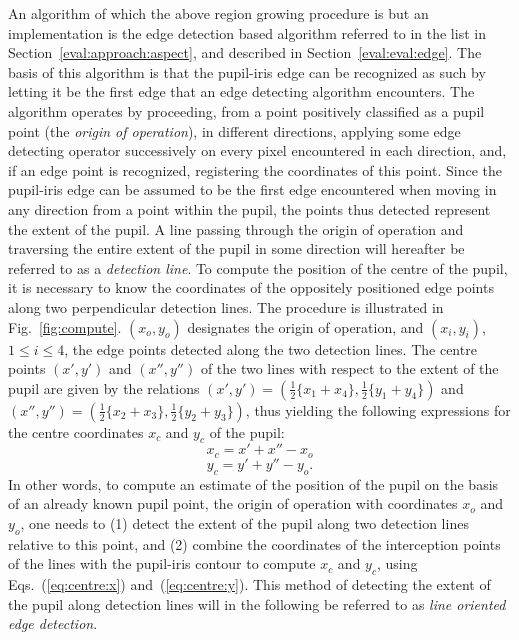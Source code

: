 An algorithm of which the above region growing procedure is but an
implementation is the edge detection based algorithm referred to in
the list in Section~\ref{eval:approach:aspect}, and described in
Section~\ref{eval:eval:edge}.  The basis of this algorithm is that the
pupil-iris edge can be recognized as such by letting it be the first
edge that an edge detecting algorithm encounters.  The algorithm
operates by proceeding, from a point positively classified as a pupil
point (the {\em origin of operation\/}), in different directions,
applying some edge detecting operator successively on every pixel
encountered in each direction, and, if an edge point is recognized,
registering the coordinates of this point.  Since the pupil-iris edge
can be assumed to be the first edge encountered when moving in any
direction from a point within the pupil, the points thus detected
represent the extent of the pupil.  A line passing through the origin
of operation and traversing the entire extent of the pupil in some
direction will hereafter be referred to as a {\em detection line\/}.
To compute the position of the centre of the pupil, it is necessary to
know the coordinates of the oppositely positioned edge points along
two perpendicular detection lines.  The procedure is illustrated in
Fig.~\ref{fig:compute}.  $(x_{o},y_{o})$ designates the origin of
operation, and $(x_{i},y_{i})$, $1\leq i\leq 4$, the edge points
detected along the two detection lines.  The centre points $(x',y')$
and $(x'',y'')$ of the two lines with respect to the extent of the
pupil are given by the relations
$(x',y')=(\frac{1}{2}\{x_{1}+x_{4}\},\frac{1}{2}\{y_{1}+y_{4}\})$ and
$(x'',y'')=(\frac{1}{2}\{x_{2}+x_{3}\},\frac{1}{2}\{y_{2}+y_{3}\})$,
thus yielding the following expressions for the centre coordinates
$x_{c}$ and $y_{c}$ of the pupil:
\begin{equation}
\label{eq:centre:x}
  x_{c}=x'+x''-x_{o}
\end{equation}
\begin{equation}
\label{eq:centre:y}
  y_{c}=y'+y''-y_{o}\mbox{.}
\end{equation}
In other words, to compute an estimate of the position of the pupil on
the basis of an already known pupil point, the origin of operation
with coordinates $x_{o}$ and $y_{o}$, one needs to (1) detect the
extent of the pupil along two detection lines relative to this point,
and (2) combine the coordinates of the interception points of the
lines with the pupil-iris contour to compute $x_{c}$ and $y_{c}$,
using Eqs.~(\ref{eq:centre:x}) and~(\ref{eq:centre:y}).  This method
of detecting the extent of the pupil along detection lines will in the
following be referred to as {\em line oriented edge detection\/}.

